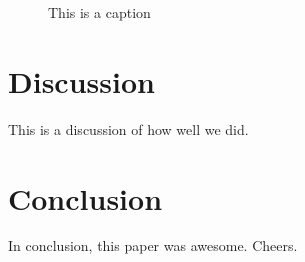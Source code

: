 \documentclass{article} %
\begin{document}
\begin{figure}[H]
\begin{center}
\end{center}
\caption{This is a caption}
\label{fig:ortho_small}
\end{figure}


\section{Discussion}
This is a discussion of how well we did.

\section{Conclusion}
In conclusion, this paper was awesome. Cheers.



\end{document}
